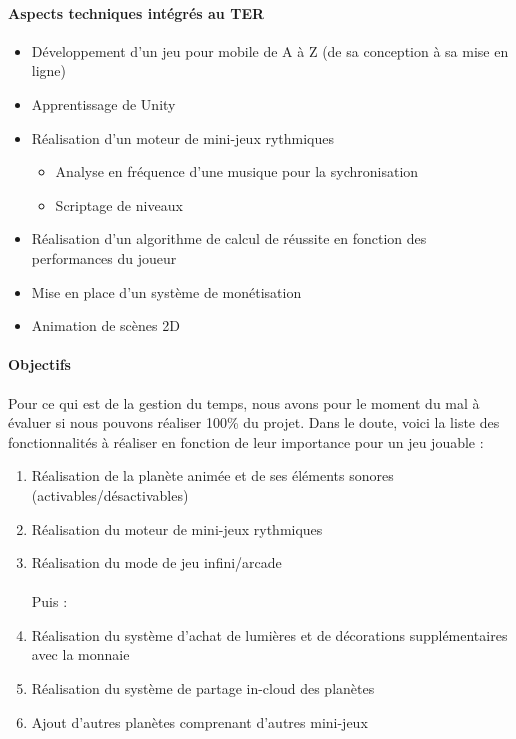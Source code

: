 \documentclass[a4paper,11pt]{article}
\begin{document}
\paragraph{Aspects techniques intégrés au TER}
\begin{itemize}
\item Développement d’un jeu pour mobile de A à Z (de sa conception à sa mise en ligne)
\item Apprentissage de Unity
\item Réalisation d’un moteur de mini-jeux rythmiques
\begin{itemize}
\item Analyse en fréquence d’une musique pour la sychronisation
\item Scriptage de niveaux
\end{itemize}
\item Réalisation d’un algorithme de calcul de réussite en fonction des performances du joueur
\item Mise en place d’un système de monétisation
\item Animation de scènes 2D
\end{itemize}

\paragraph{Objectifs} Pour ce qui est de la gestion du temps, nous avons pour le moment du mal à évaluer si nous pouvons réaliser 100\% du projet. Dans le doute, voici la liste des fonctionnalités à réaliser en fonction de leur importance pour un jeu jouable :
\begin{enumerate}
\item Réalisation de la planète animée et de ses éléments sonores (activables/désactivables)
\item Réalisation du moteur de mini-jeux rythmiques
\item Réalisation du mode de jeu infini/arcade
\\\\Puis :
\item Réalisation du système d’achat de lumières et de décorations supplémentaires avec la monnaie
\item Réalisation du système de partage in-cloud des planètes
\item Ajout d’autres planètes comprenant d’autres mini-jeux
\end{enumerate}
\end{document}
